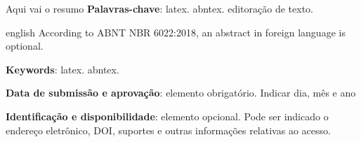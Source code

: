 \documentclass[article, 11pt, oneside, a4paper, english, brazil, sumario=tradicional]{abntex2}
\begin{document}

\frenchspacing

\maketitle
\begin{resumoumacoluna}
  Aqui vai o resumo
 \vspace{\onelineskip}
 \noindent
 \textbf{Palavras-chave}: latex. abntex. editoração de texto.
\end{resumoumacoluna}

\renewcommand{\resumoname}{Abstract}
\begin{resumoumacoluna}
 \begin{otherlanguage*}{english}
   According to ABNT NBR 6022:2018, an abstract in foreign language is optional.

   \vspace{\onelineskip}

   \noindent
   \textbf{Keywords}: latex. abntex.
 \end{otherlanguage*}
\end{resumoumacoluna}
\begin{center}\smaller
\textbf{Data de submissão e aprovação}: elemento obrigatório. Indicar dia, mês e ano

\textbf{Identificação e disponibilidade}: elemento opcional. Pode ser indicado
o endereço eletrônico, DOI, suportes e outras informações relativas ao acesso.
\end{center}

\textual
\end{document}
